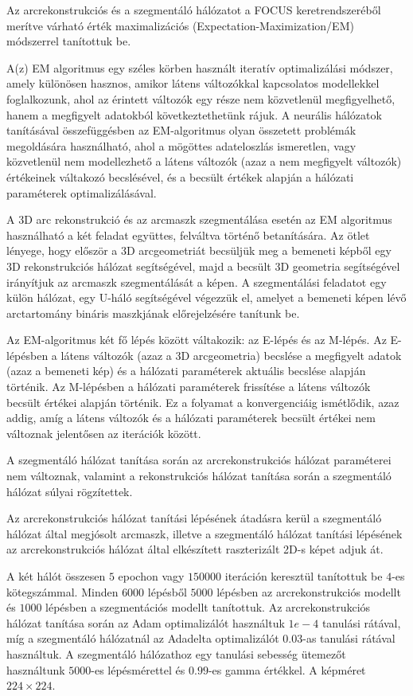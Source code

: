 \documentclass[12pt,a4]{article}
\begin{document}
        Az arcrekonstrukciós és a szegmentáló hálózatot a FOCUS keretrendszeréből merítve várható érték maximalizációs (Expectation-Maximization/EM) módszerrel tanítottuk be.

        A(z) EM algoritmus egy széles körben használt iteratív optimalizálási módszer, amely különösen hasznos, amikor látens változókkal kapcsolatos modellekkel foglalkozunk, ahol az érintett változók egy része nem közvetlenül megfigyelhető, hanem a megfigyelt adatokból következtethetünk rájuk. A neurális hálózatok tanításával összefüggésben az EM-algoritmus olyan összetett problémák megoldására használható, ahol a mögöttes adateloszlás ismeretlen, vagy közvetlenül nem modellezhető a látens változók (azaz a nem megfigyelt változók) értékeinek váltakozó becslésével, és a becsült értékek alapján a hálózati paraméterek optimalizálásával.

        A 3D arc rekonstrukció és az arcmaszk szegmentálása esetén az EM algoritmus használható a két feladat együttes, felváltva történő betanítására. Az ötlet lényege, hogy először a 3D arcgeometriát becsüljük meg a bemeneti képből egy 3D rekonstrukciós hálózat segítségével, majd a becsült 3D geometria segítségével irányítjuk az arcmaszk szegmentálását a képen. A szegmentálási feladatot egy külön hálózat, egy U-háló segítségével végezzük el, amelyet a bemeneti képen lévő arctartomány bináris maszkjának előrejelzésére tanítunk be.

        Az EM-algoritmus két fő lépés között váltakozik: az E-lépés és az M-lépés. Az E-lépésben a látens változók (azaz a 3D arcgeometria) becslése a megfigyelt adatok (azaz a bemeneti kép) és a hálózati paraméterek aktuális becslése alapján történik. Az M-lépésben a hálózati paraméterek frissítése a látens változók becsült értékei alapján történik. Ez a folyamat a konvergenciáig ismétlődik, azaz addig, amíg a látens változók és a hálózati paraméterek becsült értékei nem változnak jelentősen az iterációk között.

        A szegmentáló hálózat tanítása során az arcrekonstrukciós hálózat paraméterei nem változnak, valamint a rekonstrukciós hálózat tanítása során a szegmentáló hálózat súlyai rögzítettek.

        Az arcrekonstrukciós hálózat tanítási lépésének átadásra kerül a szegmentáló hálózat által megjósolt arcmaszk, illetve a szegmentáló hálózat tanítási lépésének az arcrekonstrukciós hálózat által elkészített raszterizált 2D-s képet adjuk át.

        A két hálót összesen $5$ epochon vagy $150000$ iteráción keresztül tanítottuk be $4$-es kötegszámmal. Minden $6000$ lépésből $5000$ lépésben az arcrekonstrukciós modellt és $1000$ lépésben a szegmentációs modellt tanítottuk. Az arcrekonstrukciós hálózat tanítása során az Adam optimalizálót használtuk $1e-4$ tanulási rátával, míg a szegmentáló hálózatnál az Adadelta optimalizálót $0.03$-as tanulási rátával használtuk.
        A szegmentáló hálózathoz egy tanulási sebesség ütemezőt használtunk $5000$-es lépésmérettel és $0.99$-es gamma értékkel. A képméret $224 \times 224$.
\end{document}
